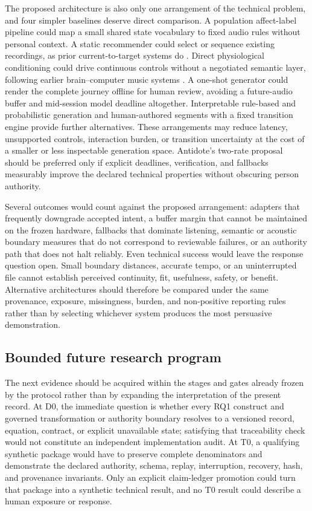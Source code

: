 The proposed architecture is also only one arrangement of the technical
problem, and four simpler baselines deserve direct comparison. A population
affect-label pipeline could map a small shared state vocabulary to fixed audio
rules without personal context. A static recommender could select or sequence
existing recordings, as prior current-to-target systems do
\citep{janssen2012tune,mallik2022effects}. Direct physiological conditioning
could drive continuous controls without a negotiated semantic layer, following
earlier brain--computer music systems \citep{daly2016abcmi,
ehrlich2019closedloop}. A one-shot generator could render the complete journey
offline for human review, avoiding a future-audio buffer and mid-session model
deadline altogether. Interpretable rule-based and probabilistic generation
\citep{agres2023affectmachine} and human-authored segments with a fixed
transition engine provide further alternatives. These arrangements may reduce
latency, unsupported controls, interaction burden, or transition uncertainty
at the cost of a smaller or less inspectable generation space. Antidote's
two-rate proposal should be preferred only if explicit deadlines,
verification, and fallbacks measurably improve the declared technical
properties without obscuring person authority.

Several outcomes would count against the proposed arrangement: adapters that
frequently downgrade accepted intent, a buffer margin that cannot be maintained
on the frozen hardware, fallbacks that dominate listening, semantic or acoustic
boundary measures that do not correspond to reviewable failures, or an
authority path that does not halt reliably. Even technical success would leave
the response question open. Small boundary distances, accurate tempo, or an
uninterrupted file cannot establish perceived continuity, fit, usefulness,
safety, or benefit. Alternative architectures should therefore be compared
under the same provenance, exposure, missingness, burden, and non-positive
reporting rules rather than by selecting whichever system produces the most
persuasive demonstration.

\subsection{Bounded future research program}
\label{sec:discussion-future-program}

The next evidence should be acquired within the stages and gates already frozen
by the protocol rather than by expanding the interpretation of the present
record. At D0, the immediate question is whether every RQ1 construct and
governed transformation or authority boundary resolves to a versioned record,
equation, contract, or explicit unavailable state; satisfying that traceability
check would not constitute an independent implementation audit. At T0, a
qualifying synthetic package would have to preserve complete denominators and
demonstrate the declared authority, schema, replay, interruption, recovery,
hash, and provenance invariants. Only an explicit claim-ledger promotion could
turn that package into a synthetic technical result, and no T0 result could
describe a human exposure or response.

